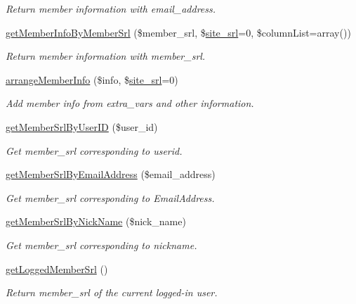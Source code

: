 \begin{DoxyCompactItemize}
\begin{DoxyCompactList}\small\item\em Return member information with email\+\_\+address. \end{DoxyCompactList}\item 
\hyperlink{classmemberModel_a24b024c02da695d9a7b7bce7b3e84135}{get\+Member\+Info\+By\+Member\+Srl} (\$member\+\_\+srl, \$\hyperlink{ko_8install_8php_a8b1406b4ad1048041558dce6bfe89004}{site\+\_\+srl}=0, \$column\+List=array())
\begin{DoxyCompactList}\small\item\em Return member information with member\+\_\+srl. \end{DoxyCompactList}\item 
\hyperlink{classmemberModel_ad1420187d8b21fb78de5a5e4b4b47a3a}{arrange\+Member\+Info} (\$info, \$\hyperlink{ko_8install_8php_a8b1406b4ad1048041558dce6bfe89004}{site\+\_\+srl}=0)
\begin{DoxyCompactList}\small\item\em Add member info from extra\+\_\+vars and other information. \end{DoxyCompactList}\item 
\hyperlink{classmemberModel_a4f548037aabac6d09b42c1a7f81311ee}{get\+Member\+Srl\+By\+User\+I\+D} (\$user\+\_\+id)
\begin{DoxyCompactList}\small\item\em Get member\+\_\+srl corresponding to userid. \end{DoxyCompactList}\item 
\hyperlink{classmemberModel_ab93bf81cb81a354594dcedea50559ce2}{get\+Member\+Srl\+By\+Email\+Address} (\$email\+\_\+address)
\begin{DoxyCompactList}\small\item\em Get member\+\_\+srl corresponding to Email\+Address. \end{DoxyCompactList}\item 
\hyperlink{classmemberModel_af83e783a285b244a510a8dc7662c80cf}{get\+Member\+Srl\+By\+Nick\+Name} (\$nick\+\_\+name)
\begin{DoxyCompactList}\small\item\em Get member\+\_\+srl corresponding to nickname. \end{DoxyCompactList}\item 
\hyperlink{classmemberModel_ae5d9411d53ee2b5fb7e101125db26c1d}{get\+Logged\+Member\+Srl} ()
\begin{DoxyCompactList}\small\item\em Return member\+\_\+srl of the current logged-\/in user. \end{DoxyCompactList}\item 

\end{DoxyCompactItemize}
